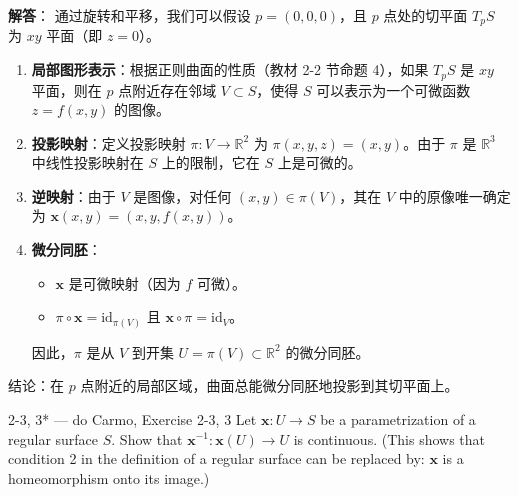 \begin{solution}
\textbf{解答}：
通过旋转和平移，我们可以假设 $p = (0, 0, 0)$，且 $p$ 点处的切平面 $T_pS$ 为 $xy$ 平面（即 $z = 0$）。

\begin{enumerate}
    \item \textbf{局部图形表示}：根据正则曲面的性质（教材 2-2 节命题 4），如果 $T_pS$ 是 $xy$ 平面，则在 $p$ 点附近存在邻域 $V \subset S$，使得 $S$ 可以表示为一个可微函数 $z = f(x, y)$ 的图像。
    \item \textbf{投影映射}：定义投影映射 $\pi: V \to \mathbb{R}^2$ 为 $\pi(x, y, z) = (x, y)$。由于 $\pi$ 是 $\mathbb{R}^3$ 中线性投影映射在 $S$ 上的限制，它在 $S$ 上是可微的。
    \item \textbf{逆映射}：由于 $V$ 是图像，对任何 $(x, y) \in \pi(V)$，其在 $V$ 中的原像唯一确定为 $\mathbf{x}(x, y) = (x, y, f(x, y))$。
    \item \textbf{微分同胚}：
    \begin{itemize}
        \item $\mathbf{x}$ 是可微映射（因为 $f$ 可微）。
        \item $\pi \circ \mathbf{x} = \text{id}_{\pi(V)}$ 且 $\mathbf{x} \circ \pi = \text{id}_V$。
    \end{itemize}
    因此，$\pi$ 是从 $V$ 到开集 $U = \pi(V) \subset \mathbb{R}^2$ 的微分同胚。
\end{enumerate}
结论：在 $p$ 点附近的局部区域，曲面总能微分同胚地投影到其切平面上。
\end{solution}

\begin{exercise}{2-3, 3* — do Carmo, Exercise 2-3, 3}
Let $\mathbf{x}: U \to S$ be a parametrization of a regular surface $S$. Show that $\mathbf{x}^{-1}: \mathbf{x}(U) \to U$ is continuous. (This shows that condition 2 in the definition of a regular surface can be replaced by: $\mathbf{x}$ is a homeomorphism onto its image.)
\end{exercise}

